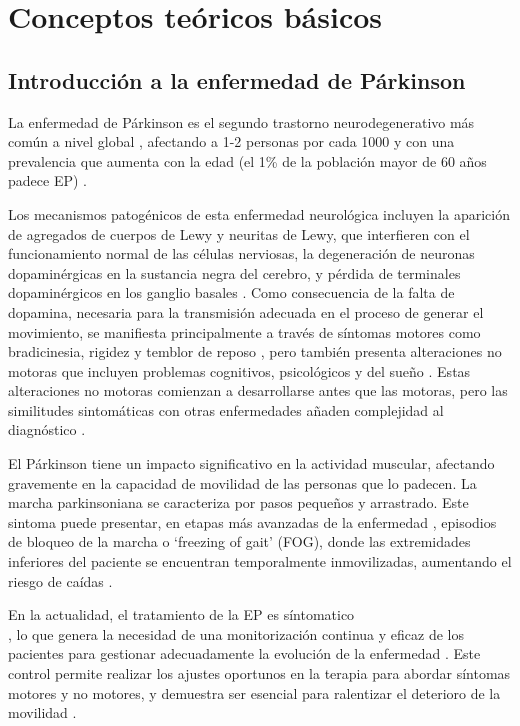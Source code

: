 
\section{Conceptos teóricos básicos}


\subsection{Introducción a la enfermedad de Párkinson}

La enfermedad de Párkinson es el segundo trastorno neurodegenerativo más común a nivel global \cite{Art2}, afectando a 1-2 personas por cada 1000 y con una prevalencia que aumenta con la edad (el 1\% de la población mayor de 60 años padece EP) \cite{Art4}.

Los mecanismos patogénicos de esta enfermedad neurológica incluyen la aparición de agregados de cuerpos de Lewy y neuritas de Lewy, que interfieren con el funcionamiento normal de las células nerviosas, la degeneración de neuronas dopaminérgicas en la sustancia negra del cerebro, y pérdida de terminales dopaminérgicos en los ganglio basales \cite{Art1}. Como consecuencia de la falta de dopamina, necesaria para la transmisión adecuada en el proceso de generar el movimiento, se manifiesta principalmente a través de síntomas motores como bradicinesia, rigidez y temblor de reposo \cite{Art4}, pero también presenta alteraciones no motoras que incluyen problemas cognitivos, psicológicos y del sueño \cite{Art5} \cite{Art6}. Estas alteraciones no motoras comienzan a desarrollarse antes que las motoras, pero las similitudes sintomáticas con otras enfermedades añaden complejidad al diagnóstico \cite{Art1}.

El Párkinson tiene un impacto significativo en la actividad muscular, afectando gravemente en la capacidad de movilidad de las personas que lo padecen. La marcha parkinsoniana se caracteriza por pasos pequeños y arrastrado. Este sintoma puede presentar, en etapas más avanzadas de la enfermedad \cite{Art2}, episodios de bloqueo de la marcha o `freezing of gait' (FOG), donde las extremidades inferiores del paciente se encuentran temporalmente inmovilizadas, aumentando el riesgo de caídas \cite{Art5} \cite{Art6}.

En la actualidad, el tratamiento de la EP es síntomatico\\ \cite{Art6}, lo que genera la necesidad de una monitorización continua y eficaz de los pacientes para gestionar adecuadamente la evolución de la enfermedad \cite{Art3}. Este control permite realizar los ajustes oportunos en la terapia para abordar síntomas motores y no motores, y demuestra ser esencial para ralentizar el deterioro de la movilidad \cite{Art6}.

